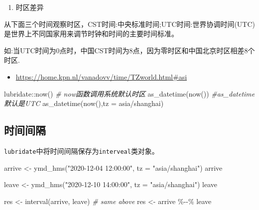 \documentclass[
]{book}
\newenvironment{Shaded}{\begin{snugshade}}{\end{snugshade}}
\newcommand{\AttributeTok}[1]{\textcolor[rgb]{0.77,0.63,0.00}{#1}}
\newcommand{\CommentTok}[1]{\textcolor[rgb]{0.56,0.35,0.01}{\textit{#1}}}
\newcommand{\FunctionTok}[1]{\textcolor[rgb]{0.00,0.00,0.00}{#1}}
\newcommand{\NormalTok}[1]{#1}
\newcommand{\OtherTok}[1]{\textcolor[rgb]{0.56,0.35,0.01}{#1}}
\newcommand{\SpecialCharTok}[1]{\textcolor[rgb]{0.00,0.00,0.00}{#1}}
\newcommand{\StringTok}[1]{\textcolor[rgb]{0.31,0.60,0.02}{#1}}
\providecommand{\tightlist}{%
  \setlength{\itemsep}{0pt}\setlength{\parskip}{0pt}}
\begin{document}
\begin{enumerate}
\def\labelenumi{\arabic{enumi}.}
\setcounter{enumi}{2}
\tightlist
\item
  时区差异
\end{enumerate}

从下面三个时间观察时区，CST时间:中央标准时间;UTC时间:世界协调时间(UTC)是世界上不同国家用来调节时钟和时间的主要时间标准。

如:当UTC时间为0点时，中国CST时间为8点，因为零时区和中国北京时区相差8个时区.

\begin{itemize}
\tightlist
\item
  \url{https://home.kpn.nl/vanadovv/time/TZworld.html\#asi}
\end{itemize}

\begin{Shaded}
\begin{Highlighting}[]
\NormalTok{lubridate}\SpecialCharTok{::}\FunctionTok{now}\NormalTok{() }\CommentTok{\# now函数调用系统默认时区}
\FunctionTok{as\_datetime}\NormalTok{(}\FunctionTok{now}\NormalTok{()) }\CommentTok{\#as\_datetime默认是UTC}
\FunctionTok{as\_datetime}\NormalTok{(}\FunctionTok{now}\NormalTok{(),}\AttributeTok{tz =} \StringTok{\textquotesingle{}asia/shanghai\textquotesingle{}}\NormalTok{)}
\end{Highlighting}
\end{Shaded}

\hypertarget{interveal}{%
\subsection{时间间隔}\label{interveal}}

\texttt{lubridate}中将时间间隔保存为\texttt{interveal}类对象。

\begin{Shaded}
\begin{Highlighting}[]
\NormalTok{arrive }\OtherTok{\textless{}{-}} \FunctionTok{ymd\_hms}\NormalTok{(}\StringTok{"2020{-}12{-}04 12:00:00"}\NormalTok{, }\AttributeTok{tz =} \StringTok{"asia/shanghai"}\NormalTok{)}
\NormalTok{arrive}

\NormalTok{leave }\OtherTok{\textless{}{-}} \FunctionTok{ymd\_hms}\NormalTok{(}\StringTok{"2020{-}12{-}10 14:00:00"}\NormalTok{, }\AttributeTok{tz =} \StringTok{"asia/shanghai"}\NormalTok{)}
\NormalTok{leave}

\NormalTok{res }\OtherTok{\textless{}{-}} \FunctionTok{interval}\NormalTok{(arrive, leave) }
\CommentTok{\# same above}
\NormalTok{res }\OtherTok{\textless{}{-}}\NormalTok{ arrive }\SpecialCharTok{\%{-}{-}\%}\NormalTok{ leave}
\end{Highlighting}
\end{Shaded}
\end{document}
